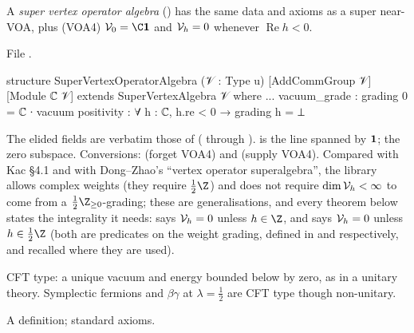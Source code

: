 \begin{definition}\label{l17:def:svoa}
A \emph{super vertex operator algebra} () has the same data and
axioms as a super near-VOA, plus (VOA4) $\lseventeenV_0=\C\lseventeenvac$ and $\mathcal{V}_h=0$ whenever
$\operatorname{Re}h<0$.
\end{definition}
\noindent File .
\begin{leancode}
structure SuperVertexOperatorAlgebra (𝒱 : Type u) [AddCommGroup 𝒱] [Module ℂ 𝒱]
    extends SuperVertexAlgebra 𝒱 where
...
  vacuum_grade : grading 0 = ℂ ∙ vacuum
  positivity : ∀ h : ℂ, h.re < 0 → grading h = ⊥
\end{leancode}
\begin{dictionary}
The elided fields are verbatim those of  ( through
).  is the line spanned by $\mathbf{1}$;  the zero
subspace. Conversions:  (forget VOA4) and
 (supply VOA4). Compared with Kac §4.1 and with Dong--Zhao's
``vertex operator superalgebra'', the library allows complex weights (they require
$\frac12\Z$) and does not require $\dim\mathcal{V}_h<\infty$ to come from a $\frac12\Z_{\ge0}$-grading;
these are generalisations, and every theorem below states the integrality it needs:
 says $\mathcal{V}_h=0$ unless $h\in\Z$, and  says
$\mathcal{V}_h=0$ unless $h\in\frac12\Z$ (both are predicates on the weight grading, defined in
 and  respectively, and recalled where they are used).
\end{dictionary}
\begin{physics}
CFT type: a unique vacuum and energy bounded below by zero, as in a unitary theory. Symplectic
fermions and $\beta\gamma$ at $\lambda=\frac12$ are CFT type though non-unitary.
\end{physics}
\begin{status}
A definition; standard axioms.
\end{status}


